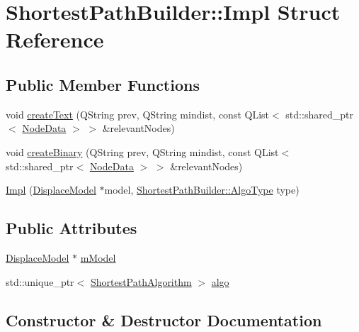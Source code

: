 \hypertarget{struct_shortest_path_builder_1_1_impl}{}\section{Shortest\+Path\+Builder\+::Impl Struct Reference}
\label{struct_shortest_path_builder_1_1_impl}
\subsection*{Public Member Functions}
\begin{DoxyCompactItemize}
\item 
void \mbox{\hyperlink{struct_shortest_path_builder_1_1_impl_adeedcada797100857b8101e9dd8aba20}{create\+Text}} (Q\+String prev, Q\+String mindist, const Q\+List$<$ std\+::shared\+\_\+ptr$<$ \mbox{\hyperlink{class_node_data}{Node\+Data}} $>$ $>$ \&relevant\+Nodes)
\item 
void \mbox{\hyperlink{struct_shortest_path_builder_1_1_impl_a6f3f909f1eef789e3a4dd7dcc7734b66}{create\+Binary}} (Q\+String prev, Q\+String mindist, const Q\+List$<$ std\+::shared\+\_\+ptr$<$ \mbox{\hyperlink{class_node_data}{Node\+Data}} $>$ $>$ \&relevant\+Nodes)
\item 
\mbox{\hyperlink{struct_shortest_path_builder_1_1_impl_af1dbd11fb1994e34aa0cdf89299c0582}{Impl}} (\mbox{\hyperlink{class_displace_model}{Displace\+Model}} $\ast$model, \mbox{\hyperlink{class_shortest_path_builder_a1ba5dda0ad139bf12f34e1eb552bcb13}{Shortest\+Path\+Builder\+::\+Algo\+Type}} type)
\end{DoxyCompactItemize}
\subsection*{Public Attributes}
\begin{DoxyCompactItemize}
\item 
\mbox{\hyperlink{class_displace_model}{Displace\+Model}} $\ast$ \mbox{\hyperlink{struct_shortest_path_builder_1_1_impl_a49fd32cfa2e1acbac7e504752ccf04d7}{m\+Model}}
\item 
std\+::unique\+\_\+ptr$<$ \mbox{\hyperlink{class_shortest_path_algorithm}{Shortest\+Path\+Algorithm}} $>$ \mbox{\hyperlink{struct_shortest_path_builder_1_1_impl_a5bd31625c55e559d0dd32ad888fd6097}{algo}}
\end{DoxyCompactItemize}


\subsection{Constructor \& Destructor Documentation}
\mbox{\label{struct_shortest_path_builder_1_1_impl_af1dbd11fb1994e34aa0cdf89299c0582}} 
